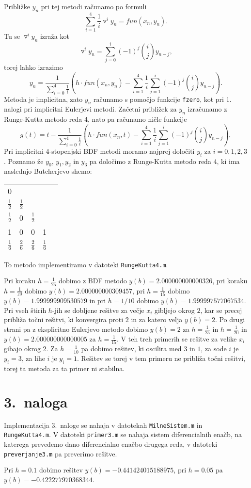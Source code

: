 \documentclass[a4paper,12pt]{article}
\begin{document}
Približke $y_n$ pri tej metodi računamo po formuli 
$$\sum_{i=1}^4 \frac{1}{i} \triangledown^i y_n = fun(x_n,y_n).$$
Tu se $\triangledown^i y_n$ izraža kot
$$\triangledown^i y_n = \sum_{j=0}^i (-1)^j {i\choose j} y_{n-j},$$
torej lahko izrazimo 
$$y_n = \frac{1}{\sum_{i=0}^4 \frac{1}{i}}(h\cdot fun(x_n,y_n)-
\sum_{i=1}^4 \frac{1}{i}\sum_{j=1}^i (-1)^j{i \choose j}y_{n-j}).$$
Metoda je implicitna, zato $y_n$ računamo s pomočjo funkcije \texttt{fzero}, 
kot pri 1. nalogi
pri implicitni Eulerjevi metodi. Začetni približek za $y_n$ izračunamo
z Runge-Kutta metodo reda 4, nato pa računamo ničle funkcije
$$g(t) =t- \frac{1}{\sum_{i=0}^4 \frac{1}{i}}(h\cdot fun(x_n,t)-
\sum_{i=1}^4 \frac{1}{i}\sum_{j=1}^i (-1)^j{i \choose j}y_{n-j}),$$
Pri implicitni 4-stopenjski BDF metodi moramo najprej določiti 
$y_i$ za $i=0,1,2,3$. Poznamo že $y_0$, $y_1, y_2$ in $y_3$ pa določimo
z Runge-Kutta metodo reda 4, ki ima naslednjo Butcherjevo shemo:
\begin{center}
    \begin{tabular}{c|cccc}
     0&  &  &  &  \\
     $\frac{1}{2}$ & $\frac{1}{2}$ &  &  &  \\
     $\frac{1}{2}$ & 0 & $\frac{1}{2}$ &  &  \\
     1 & 0 & 0 & 1 &  \\ \hline
     $\frac{1}{6}$ & $\frac{2}{6}$ & $\frac{2}{6}$ & $\frac{1}{6}$ & 
    \end{tabular}
\end{center}
To metodo implementiramo v datoteki \texttt{RungeKutta4.m}.

Pri koraku $h=\frac{1}{25}$ dobimo z BDF metodo $y(b)=2.000000000000326$,
pri koraku $h=\frac{1}{20}$ dobimo $y(b)=2.000000000309457$, pri $h=\frac{1}{15}$
dobimo $y(b)=1.999999909530579$ in pri $h=1/10$ dobimo $y(b)=1.999997577067534$. 
Pri vseh štirih $h$-jih se dobljene rešitve za večje $x_i$ gibljejo okrog $2$,
kar se precej približa točni rešitvi, ki konvergira proti $2$ in za katero velja
$y(b)=2$.
Po drugi strani pa z eksplicitno Eulerjevo metodo dobimo $y(b)=2$ za $h=\frac{1}{25}$
in $h=\frac{1}{20}$ in $y(b)=2.000000000000005$ za $h=\frac{1}{15}$. V teh treh
primerih se rešitve za velike $x_i$ gibajo okrog $2$. Za $h=\frac{1}{10}$ pa 
dobimo rešitev, ki oscilira med $3$ in $1$, za sode $i$ je $y_i=3$, za lihe
$i$ je $y_i=1$. Rešitev se torej v tem primeru ne približa točni rešitvi, 
torej ta metoda za ta primer ni stabilna.

\section*{3.\ naloga}

Implementacija 3.\ naloge se nahaja v datotekah \texttt{MilneSistem.m}
in \texttt{RungeKutta4.m}. V datoteki \texttt{primer3.m} se nahaja sistem 
diferencialnih enačb, na katerega prevedemo dano diferencialno enačbo drugega reda,
v datoteki \texttt{preverjanje3.m} pa preverimo rešitve.

Pri $h=0.1$ dobimo rešitev $y(b)=-0.441424015188975$, pri $h=0.05$ pa 
$y(b)=-0.422277970368344$.
\end{document}

